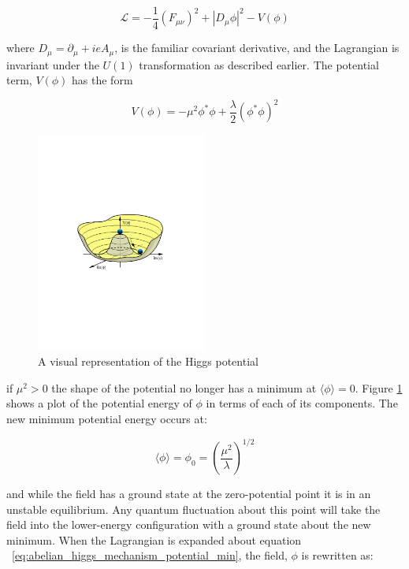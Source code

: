 \begin{equation}\label{eq:abelian_higgs_mechanism_lagrangian}
\mathcal{L} = -\frac{1}{4}(F_{\mu\nu})^{2} + |D_{\mu}\phi|^{2} -
V(\phi)
\end{equation}

\noindent where $D_{\mu} = \partial_{\mu} + ieA_{\mu}$, is the familiar
covariant derivative, and the Lagrangian is invariant under the $U(1)$
transformation as described earlier.  The potential term, $V(\phi)$
has the form

\begin{equation}\label{eq:abelian_higgs_mechanism_potential}
V(\phi) = -\mu^{2}\phi^{\ast}\phi +
\frac{\lambda}{2}(\phi^{\ast}\phi)^{2}
\end{equation}

\begin{figure}[h]
   \centering
  \includegraphics[width=0.5\textwidth]{Figures/Basic_Diagrams/higgs-potential.pdf}
  \caption{A visual representation of the Higgs potential \cite{th:HiggsPotential}} \label{fig:higgs_potential}
\end{figure}

\noindent if $\mu^{2}>0$ the shape of the potential no longer has a
minimum at $\langle\phi\rangle = 0$.  Figure \ref{fig:higgs_potential}
shows a plot of the potential energy of $\phi$ in terms of each of its
components.  The new minimum potential energy
occurs at:

\begin{equation}\label{eq:abelian_higgs_mechanism_potential_min}
\langle\phi\rangle = \phi_{0} = \left(\frac{\mu^{2}}{\lambda}\right)^{1/2}
\end{equation}

\noindent and while the field has a ground state at the zero-potential
point it is in an unstable equilibrium.  Any quantum fluctuation about
this point will take the field into the lower-energy configuration
with a ground state about the new minimum.  When the Lagrangian is
expanded about equation ~\ref{eq:abelian_higgs_mechanism_potential_min}, the
field, $\phi$ is rewritten as: 

